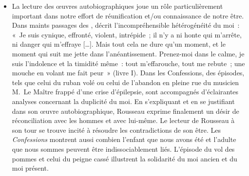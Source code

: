 {\begin{itemize}[label=\textbullet]
\item La lecture des œuvres autobiographiques joue un rôle particulièrement important
dans notre effort de réunification et/ou connaissance de notre être. Dans maints
passages des ,  décrit l'incompréhensible hétérogénéité du
moi~: «~Je suis cynique, effronté, violent, intrépide~; il n'y a ni honte qui m'arrête, ni danger qui m'effraye […]. Mais tout cela ne dure qu'un moment, et le moment qui suit
me jette dans l'anéantissement. Prenez-moi dans le calme, je suis l'indolence et la
timidité même~: tout m'effarouche, tout me rebute~; une mouche en volant me fait
peur~» (livre I\ier{}). Dans les Confessions, des épisodes, tels que celui du ruban volé ou
celui de l'abandon en pleine rue du musicien M.~Le Maître frappé d'une crise
d'épilepsie, sont accompagnés d'éclairantes analyses concernant la duplicité du moi.
En s'expliquant et en se justifiant dans son œuvre autobiographique, Rousseau
exprime finalement un désir de réconciliation avec les hommes et avec lui-même. Le
lecteur de Rousseau à son tour se trouve incité à résoudre les contradictions de son
être. Les \emph{Confessions} montrent aussi combien l'enfant que nous avons été et l'adulte
que nous sommes peuvent être indissociablement liés. L'épisode du vol des pommes
et celui du peigne cassé illustrent la solidarité du moi ancien et du moi présent.


\end{itemize}}

